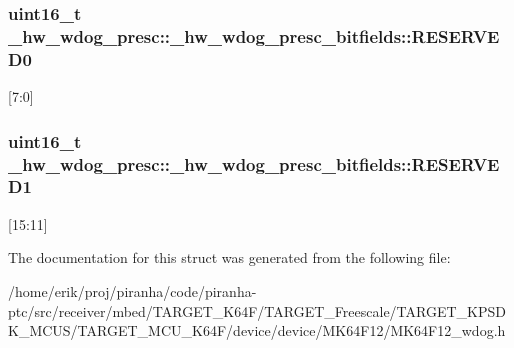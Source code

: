 \subsubsection[{\texorpdfstring{R\+E\+S\+E\+R\+V\+E\+D0}{RESERVED0}}]{\setlength{\rightskip}{0pt plus 5cm}uint16\+\_\+t \+\_\+hw\+\_\+wdog\+\_\+presc\+::\+\_\+hw\+\_\+wdog\+\_\+presc\+\_\+bitfields\+::\+R\+E\+S\+E\+R\+V\+E\+D0}\hypertarget{struct__hw__wdog__presc_1_1__hw__wdog__presc__bitfields_a84c9acb67d9a05d4962c52a4c8afd5b7}{}\label{struct__hw__wdog__presc_1_1__hw__wdog__presc__bitfields_a84c9acb67d9a05d4962c52a4c8afd5b7}
\mbox{[}7\+:0\mbox{]} 
\subsubsection[{\texorpdfstring{R\+E\+S\+E\+R\+V\+E\+D1}{RESERVED1}}]{\setlength{\rightskip}{0pt plus 5cm}uint16\+\_\+t \+\_\+hw\+\_\+wdog\+\_\+presc\+::\+\_\+hw\+\_\+wdog\+\_\+presc\+\_\+bitfields\+::\+R\+E\+S\+E\+R\+V\+E\+D1}\hypertarget{struct__hw__wdog__presc_1_1__hw__wdog__presc__bitfields_a971430ddbb5973e53da35490116096ba}{}\label{struct__hw__wdog__presc_1_1__hw__wdog__presc__bitfields_a971430ddbb5973e53da35490116096ba}
\mbox{[}15\+:11\mbox{]} 

The documentation for this struct was generated from the following file\+:\begin{DoxyCompactItemize}
\item 
/home/erik/proj/piranha/code/piranha-\/ptc/src/receiver/mbed/\+T\+A\+R\+G\+E\+T\+\_\+\+K64\+F/\+T\+A\+R\+G\+E\+T\+\_\+\+Freescale/\+T\+A\+R\+G\+E\+T\+\_\+\+K\+P\+S\+D\+K\+\_\+\+M\+C\+U\+S/\+T\+A\+R\+G\+E\+T\+\_\+\+M\+C\+U\+\_\+\+K64\+F/device/device/\+M\+K64\+F12/M\+K64\+F12\+\_\+wdog.\+h\end{DoxyCompactItemize}
